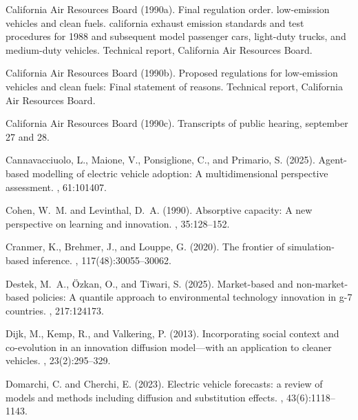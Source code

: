 \documentclass[12pt]{article}
\begin{document}
\begin{thebibliography}{}
{California Air Resources Board} (1990a).
\newblock Final regulation order. low-emission vehicles and clean fuels.
  california exhaust emission standards and test procedures for 1988 and
  subsequent model passenger cars, light-duty trucks, and medium-duty vehicles.
\newblock Technical report, California Air Resources Board.

{California Air Resources Board} (1990b).
\newblock Proposed regulations for low-emission vehicles and clean fuels: Final
  statement of reasons.
\newblock Technical report, California Air Resources Board.

{California Air Resources Board} (1990c).
\newblock Transcripts of public hearing, september 27 and 28.

Cannavacciuolo, L., Maione, V., Ponsiglione, C., and Primario, S. (2025).
\newblock Agent-based modelling of electric vehicle adoption: A
  multidimensional perspective assessment.
, 61:101407.

Cohen, W.~M. and Levinthal, D.~A. (1990).
\newblock Absorptive capacity: A new perspective on learning and innovation.
, 35:128--152.

Cranmer, K., Brehmer, J., and Louppe, G. (2020).
\newblock The frontier of simulation-based inference.
,
  117(48):30055--30062.

Destek, M.~A., {\"O}zkan, O., and Tiwari, S. (2025).
\newblock Market-based and non-market-based policies: A quantile approach to
  environmental technology innovation in g-7 countries.
, 217:124173.

Dijk, M., Kemp, R., and Valkering, P. (2013).
\newblock Incorporating social context and co-evolution in an innovation
  diffusion model—with an application to cleaner vehicles.
, 23(2):295--329.

Domarchi, C. and Cherchi, E. (2023).
\newblock Electric vehicle forecasts: a review of models and methods including
  diffusion and substitution effects.
, 43(6):1118--1143.


\end{thebibliography}
\end{document}
